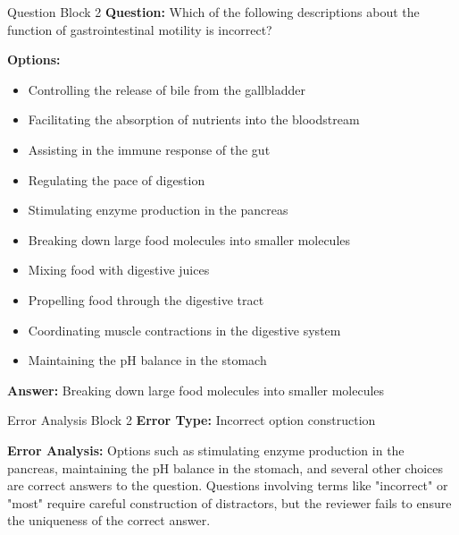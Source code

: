 \begin{questionbox}{Question Block 2}
\noindent \textbf{Question:} Which of the following descriptions about the function of gastrointestinal motility is incorrect?

\bigskip
\noindent \textbf{Options:}
\begin{itemize}
    \item Controlling the release of bile from the gallbladder
    \item Facilitating the absorption of nutrients into the bloodstream
    \item Assisting in the immune response of the gut
    \item Regulating the pace of digestion
    \item Stimulating enzyme production in the pancreas
    \item Breaking down large food molecules into smaller molecules
    \item Mixing food with digestive juices
    \item Propelling food through the digestive tract
    \item Coordinating muscle contractions in the digestive system
    \item Maintaining the pH balance in the stomach
\end{itemize}

\noindent \textbf{Answer:} Breaking down large food molecules into smaller molecules
\end{questionbox}

\begin{errorbox}{Error Analysis Block 2}
\noindent \textbf{Error Type:} Incorrect option construction

\noindent \textbf{Error Analysis:} Options such as stimulating enzyme production in the pancreas, maintaining the pH balance in the stomach, and several other choices are correct answers to the question. Questions involving terms like "incorrect" or "most" require careful construction of distractors, but the reviewer fails to ensure the uniqueness of the correct answer.
\end{errorbox}


